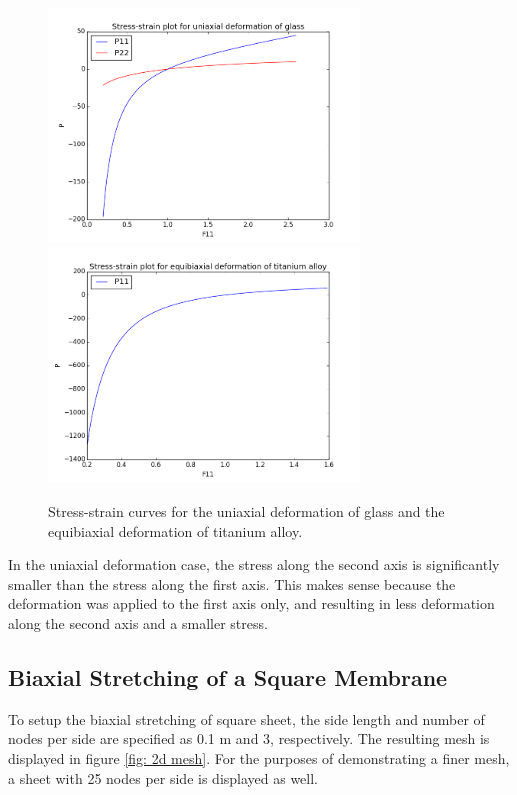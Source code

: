 \documentclass[]{spie}  %
\begin{document}
\begin{figure}[h]
	\centering
	\includegraphics[width=3.25in]{uniaxial_stress_strain.png} \quad
	\includegraphics[width=3.25in]{equibiaxial_stress_strain.png} 
	\caption{Stress-strain curves for the uniaxial deformation of glass and the equibiaxial deformation of titanium alloy.} 
	\label{fig: axial deformation}
\end{figure}
In the uniaxial deformation case, the stress along the second axis is significantly smaller than the stress along the first axis. This makes sense because the deformation was applied to the first axis only, and resulting in less deformation along the second axis and a smaller stress. 

\subsection{Biaxial Stretching of a Square Membrane}
To setup the biaxial stretching of square sheet, the side length and number of nodes per side are specified as 0.1 m and 3, respectively. The resulting mesh is displayed in figure \ref{fig: 2d mesh}. For the purposes of demonstrating a finer mesh, a sheet with 25 nodes per side is displayed as well.
\end{document}
